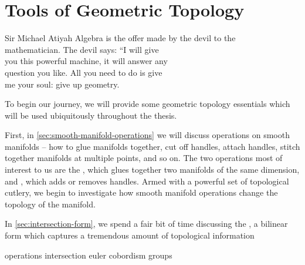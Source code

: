 \chapter{Tools of Geometric Topology}\label{chap:fundamentals}

%
%

\begin{epigraph}{20em}{Sir Michael Atiyah}
	Algebra is the offer made by the devil to the \\
	mathematician. The devil says: ``I will give \\
	you this powerful machine, it will answer any \\
	question you like. All you need to do is give\\
	me your soul: give up geometry.
\end{epigraph}

\noindent
To begin our journey, we will provide some geometric topology essentials which will be used ubiquitously throughout the thesis.

First, in \cref{sec:smooth-manifold-operations} we will discuss operations on smooth manifolds -- how to glue manifolds together, cut off handles, attach handles, stitch together manifolds at multiple points, and so on. The two operations most of interest to us are the , which glues together two manifolds of the same dimension, and , which adds or removes handles. 
Armed with a powerful set of topological cutlery, we begin to investigate how smooth manifold operations change the topology of the manifold. 

In \cref{sec:intersection-form}, we spend a fair bit of time discussing the , a bilinear form which captures a tremendous amount of topological information 



{operations}
{intersection}
{euler}
{cobordism}
{groups}
